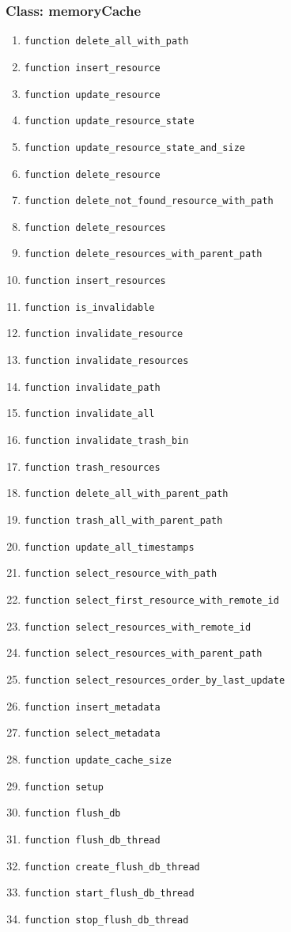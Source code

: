 \subsubsection{Class: memoryCache}
\begin{enumerate}
    \item \verb|function delete_all_with_path| 
    \item \verb|function insert_resource| 
    \item \verb|function update_resource| 
    \item \verb|function update_resource_state| 
    \item \verb|function update_resource_state_and_size| 
    \item \verb|function delete_resource| 
    \item \verb|function delete_not_found_resource_with_path| 
    \item \verb|function delete_resources| 
    \item \verb|function delete_resources_with_parent_path| 
    \item \verb|function insert_resources| 
    \item \verb|function is_invalidable| 
    \item \verb|function invalidate_resource| 
    \item \verb|function invalidate_resources| 
    \item \verb|function invalidate_path| 
    \item \verb|function invalidate_all| 
    \item \verb|function invalidate_trash_bin| 
    \item \verb|function trash_resources| 
    \item \verb|function delete_all_with_parent_path| 
    \item \verb|function trash_all_with_parent_path| 
    \item \verb|function update_all_timestamps| 
    \item \verb|function select_resource_with_path| 
    \item \verb|function select_first_resource_with_remote_id| 
    \item \verb|function select_resources_with_remote_id| 
    \item \verb|function select_resources_with_parent_path| 
    \item \verb|function select_resources_order_by_last_update| 
    \item \verb|function insert_metadata| 
    \item \verb|function select_metadata| 
    \item \verb|function update_cache_size| 
    \item \verb|function setup| 
    \item \verb|function flush_db| 
    \item \verb|function flush_db_thread| 
    \item \verb|function create_flush_db_thread| 
    \item \verb|function start_flush_db_thread| 
    \item \verb|function stop_flush_db_thread| 
\end{enumerate}
